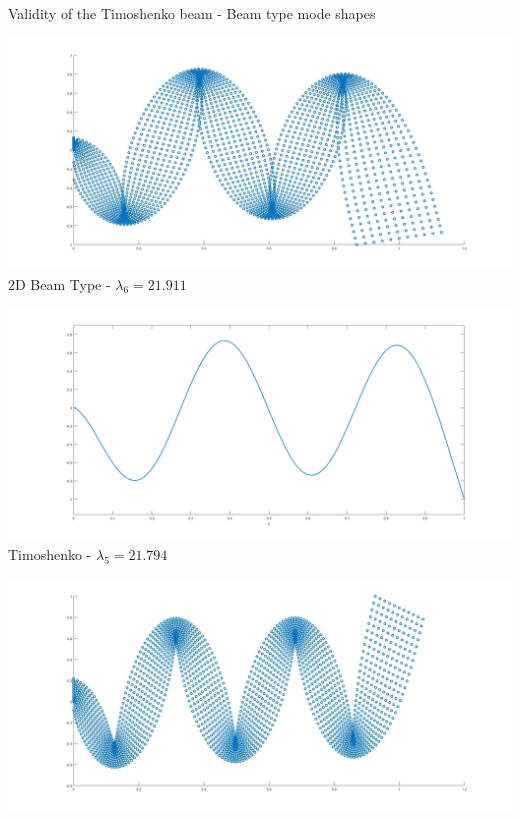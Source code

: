 \documentclass[8pt]{beamer}
\begin{document}
        \begin{frame}{Validity of the Timoshenko beam - Beam type mode shapes}
            \centering
            \begin{minipage}[b]{0.45\textwidth}
                \includegraphics[width=\textwidth]{Beam1.jpg}
                \\ 2D Beam Type - $\lambda_6 = 21.911$
                \label{fig:minipage2}
            \end{minipage}
            \hfill
            \begin{minipage}[b]{0.45\textwidth}
                \includegraphics[width=\textwidth]{1DBeam2.png}
                \\ Timoshenko - $\lambda_5 = 21.794$
                \label{fig:minipage1}
            \end{minipage}
            \vspace{1em}
            \begin{minipage}[b]{0.45\textwidth}
                \includegraphics[width=\textwidth]{Beam2.jpg}

\end{minipage}
\end{frame}
\end{document}
